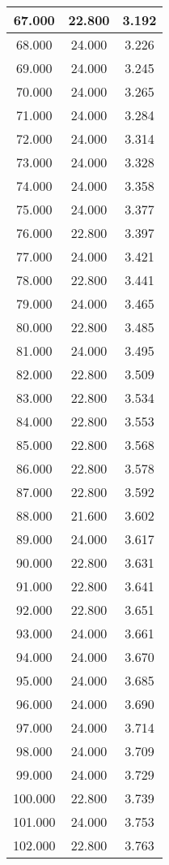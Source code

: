 \begin{longtable}[c]{|c|c|c|}
67.000	&22.800&3.192  \\ \hline 	
68.000	&24.000&3.226  \\ \hline 	
69.000	&24.000&3.245  \\ \hline 	
70.000	&24.000&3.265  \\ \hline 	
71.000	&24.000&3.284  \\ \hline 	
72.000	&24.000&3.314  \\ \hline 	
73.000	&24.000&3.328  \\ \hline 	
74.000	&24.000&3.358  \\ \hline 	
75.000	&24.000&3.377  \\ \hline 	
76.000	&22.800&3.397  \\ \hline 	
77.000	&24.000&3.421  \\ \hline 	
78.000	&22.800&3.441  \\ \hline 	
79.000	&24.000&3.465  \\ \hline 	
80.000	&22.800&3.485  \\ \hline 	
81.000	&24.000&3.495  \\ \hline 	
82.000	&22.800&3.509  \\ \hline 	
83.000	&22.800&3.534  \\ \hline 	
84.000	&22.800&3.553  \\ \hline 	
85.000	&22.800&3.568  \\ \hline 	
86.000	&22.800&3.578  \\ \hline 	
87.000	&22.800&3.592  \\ \hline 	
88.000	&21.600&3.602  \\ \hline 	
89.000	&24.000&3.617  \\ \hline 	
90.000	&22.800&3.631  \\ \hline 	
91.000	&22.800&3.641  \\ \hline 	
92.000	&22.800&3.651  \\ \hline 	
93.000	&24.000&3.661  \\ \hline 	
94.000	&24.000&3.670  \\ \hline 	
95.000	&24.000&3.685  \\ \hline 	
96.000	&24.000&3.690  \\ \hline 	
97.000	&24.000&3.714  \\ \hline 	
98.000	&24.000&3.709  \\ \hline 	
99.000	&24.000&3.729  \\ \hline 	
100.000	&22.800&3.739  \\ \hline 	
101.000	&24.000&3.753  \\ \hline 	
102.000	&22.800&3.763  \\ \hline 	

\end{longtable}
